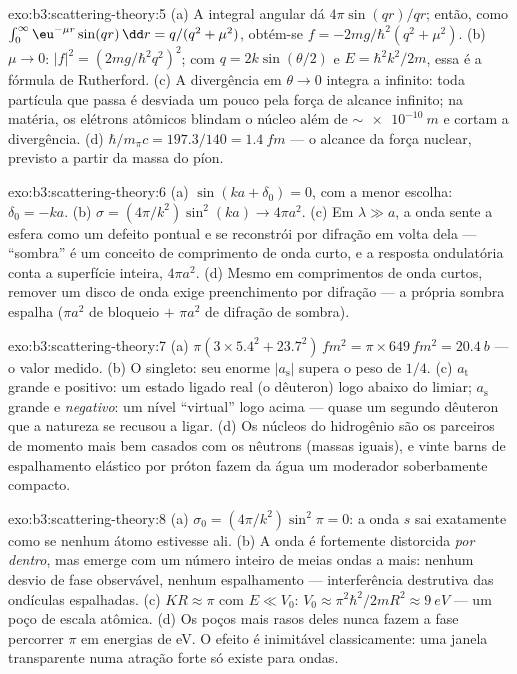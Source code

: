 \begin{solution}{exo:b3:scattering-theory:5}
(a) A integral angular dá $4\pi\sin(qr)/qr$; então, como
$\int_0^\infty\eu^{-\mu r}\sin(qr)\,\dd r = q/(q^2 + \mu^2)$,
obtém-se $f = -2mg/\hbar^2(q^2 + \mu^2)$. (b) $\mu \to 0$: $|f|^2 =
(2mg/\hbar^2q^2)^2$; com $q = 2k\sin(\theta/2)$ e $E =
\hbar^2k^2/2m$, essa é a fórmula de Rutherford. (c) A divergência em
$\theta \to
0$ integra a infinito: toda partícula que passa é desviada um pouco
pela força de alcance infinito; na matéria, os elétrons atômicos
blindam o núcleo além de $\sim\qty{e-10}{m}$ e cortam a divergência.
(d) $\hbar/m_\pi c = 197.3/140 = \qty{1.4}{fm}$ --- o alcance da força
nuclear, previsto a partir da massa do píon.
\end{solution}

\begin{solution}{exo:b3:scattering-theory:6}
(a) $\sin(ka + \delta_0) = 0$, com a menor escolha: $\delta_0
= -ka$. (b) $\sigma = (4\pi/k^2)\sin^2(ka) \to 4\pi a^2$. (c) Em
$\lambda \gg a$, a onda sente a esfera como um defeito pontual e se
reconstrói por difração em volta dela --- ``sombra'' é um conceito de
comprimento de onda curto, e a resposta ondulatória conta a superfície
inteira, $4\pi a^2$. (d) Mesmo em comprimentos de onda curtos, remover
um disco de onda exige preenchimento por difração --- a própria sombra
espalha ($\pi a^2$ de bloqueio $+$ $\pi a^2$ de difração de sombra).
\end{solution}

\begin{solution}{exo:b3:scattering-theory:7}
(a) $\pi(3 \times 5.4^2 + 23.7^2)\,\unit{fm^2} = \pi \times 649
\,\unit{fm^2} = \qty{20.4}{b}$ --- o valor medido. (b) O singleto: seu
enorme $|a_{\text{s}}|$ supera o peso de $1/4$. (c)
$a_{\text{t}}$ grande e positivo: um estado ligado real (o dêuteron)
logo abaixo do limiar; $a_{\text{s}}$ grande e \emph{negativo}: um
nível ``virtual'' logo acima --- quase um segundo dêuteron que a
natureza se recusou a ligar. (d) Os núcleos do hidrogênio são os
parceiros de momento mais bem casados com os nêutrons (massas iguais),
e vinte barns de espalhamento elástico por próton fazem da água um
moderador soberbamente compacto.
\end{solution}

\begin{solution}{exo:b3:scattering-theory:8}
(a) $\sigma_0 = (4\pi/k^2)\sin^2\pi = 0$: a onda $s$ sai exatamente
como se nenhum átomo estivesse ali. (b) A onda é fortemente distorcida
\emph{por dentro}, mas emerge com um número inteiro de meias ondas a
mais: nenhum desvio de fase observável, nenhum espalhamento ---
interferência destrutiva das ondículas espalhadas. (c) $KR
\approx \pi$ com $E \ll V_0$: $V_0 \approx \pi^2\hbar^2/2mR^2
\approx \qty{9}{eV}$ --- um poço de escala atômica. (d) Os poços mais
rasos deles nunca fazem a fase percorrer $\pi$ em energias de eV. O
efeito é inimitável classicamente: uma janela transparente numa atração
forte só existe para ondas.
\end{solution}

